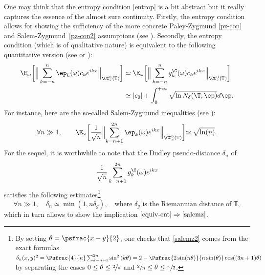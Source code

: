 One may think that the entropy condition \eqref{entrop} is a bit abstract but it really captures the essence of the almost sure continuity.
Firstly, the entropy condition allows for showing the sufficiency of the more concrete Paley-Zygmund \eqref{pz-con} and Salem-Zygmund~\eqref{pz-con2} assumptions (see \cite[Part VII.1]{pisier1981}).
Secondly, the entropy condition (which is of qualitative nature) is equivalent to the following quantitative version (see \cite[p.\,11]{pisier1981} or \cite[p.\,3--4]{pisier1977}):\vspace*{-3pt}
\begin{equation}\label{equiv-ent}
\begin{aligned}
\E_\omega\biggl[\Big\|\sum_{k=-n}^n \ep_k(\omega) c_k e^{ikx} \Big\|_{\CC_x^0(\mathcal{\mathbb{T}})}\biggr] & \simeq \E_\omega\biggl[\Big\|\sum_{k=-n}^n g_k^{\C}(\omega) c_k e^{ikx} \Big\|_{\CC_x^0(\mathcal{\mathbb{T}})}\biggr]\\ 
& \simeq |c_0|+\int_{0}^{+\infty} \sqrt{\ln N_{\delta}(\T,\ep)} d\ep.
\end{aligned}
\end{equation}
For instance, here are the so-called Salem-Zygmund inequalities (see \cite[p.\,259]{queff2}):\vspace*{-3pt}
\begin{equation}\label{salemz}
\forall n\gg 1, \qquad \E_{\omega}\biggl[\frac{1}{\sqrt{n}}\Bigl\Vert \sum_{k=n+1}^{2n}\ep_k(\omega) e^{ikx} \Bigr\Vert_{\CC_x^0(\mathbb{T})} \biggl]\simeq \sqrt{\ln(n)}.
\end{equation}
For the sequel, it is worthwhile to note that the Dudley pseudo-distance $\delta_n$ of\vspace*{-3pt}
\begin{equation*}
\frac{1}{\sqrt{n}}\sum_{k=n+1}^{2n}g_k^{\C}(\omega) e^{ikx}
\end{equation*} satisfies the following estimates\footnote{
By setting $\theta=\psfrac{x-y}{2}$, one checks that \eqref{salemz2} comes from the exact formulas $\delta_n(x,y)^2 = \Psfrac{4}{n}\sum_{k=n+1}^{2n} \sin^2\left(k\theta\right)=2-\Psfrac{2\sin(n\theta)}{n\sin(\theta)}\cos((3n+1)\theta)$ by separating the cases $0\leq \theta\leq \sfrac{2}{n}$ and $\sfrac{2}{n}\leq \theta\leq \sfrac{\pi}{2}$.}
\begin{equation}\label{salemz2}
\forall n\gg1, \quad \delta_n\simeq \min(1,n\delta_{g}), \quad \text{where $\delta_{g}$ is the Riemannian distance of }\mathbb{T},
\end{equation}
which in turn allows to show the implication $\eqref{equiv-ent}\Rightarrow\eqref{salemz}$.

